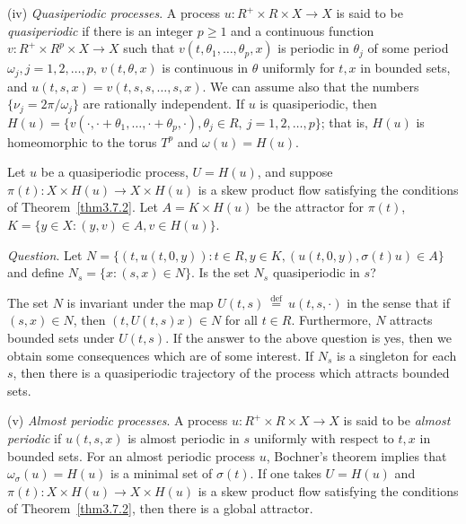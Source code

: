 \documentclass{surv-l}
\theoremstyle{plain}
\theoremstyle{definition}
\numberwithin{equation}{section}
\numberwithin{figure}{chapter}
\begin{document}
(iv) \emph{Quasiperiodic processes}. A process $u\!:R^{+}\times R\times X\rightarrow X$ is said to be \emph{quasiperiodic} if there is an integer $p\geq 1$ and a continuous function $ v\!:R^{+}\times R^{p}\times X\rightarrow X$ such that $v(t,\theta_{1},\ldots,\theta_{p},x)$ is periodic in $\theta_{j}$ of some period $\omega_{j},j= 1,2,\ldots,p,\,v(t,\theta,x)$ is continuous in $\theta$ uniformly for $t,x$ in bounded sets, and $u(t,s,x)=v(t,s,s,\ldots,s,x)$. We can assume also that the numbers $\{\nu_{j}=2\pi/\omega_{j}\}$ are rationally independent. If $u$ is quasiperiodic, then $H(u)=\{v(\cdot,\cdot+\theta_{1},\ldots,\cdot+\theta_{p},\cdot),\theta_{j}\in R,\ j=1,2,\ldots,p\}$; that is, $H(u)$ is homeomorphic to the torus $T^{p}$ and $\omega(u)=H(u)$.



Let $u$ be a quasiperiodic process, $U=H(u)$, and suppose $\pi(t)\!:X\times H(u)\rightarrow X\times H(u)$ is a skew product flow satisfying the conditions of Theorem~\ref{thm3.7.2}. Let $A=K\times H(u)$ be the attractor for $\pi(t)$, $K=\{y\in X\!:(y, v)\in A, v\in H(u)\}$.

\emph{Question}. Let $N=\{(t, u(t, 0, y))\!:t\in R, y\in K, (u(t, 0, y), \sigma(t)u)\in A\}$ and define $N_{s}=\{x\!:(s, x)\in N\}$. Is the set $N_{s}$ quasiperiodic in $s$?

The set $N$ is invariant under the map $U(t,s)\ {\overset{\mathrm{def}}{=}}\ u(t,s,\cdot)$ in the sense that if $(s,x)\in N$, then $(t,U(t,s)x)\in N$ for all $t\in R$. Furthermore, $N$ attracts bounded sets under $U(t,s)$. If the answer to the above question is yes, then we obtain some consequences which are of some interest. If $N_{s}$ is a singleton for each $s$, then there is a quasiperiodic trajectory of the process which attracts bounded sets.

(v) \emph{Almost periodic processes}. A process $u\!:R^{+}\times R\times X\rightarrow X$ is said to be \emph{almost periodic} if $u(t,s,x)$ is almost periodic in $s$ uniformly with respect to $t,x$ in bounded sets. For an almost periodic process $u$, Bochner's theorem implies that $\omega_{\sigma}(u)=H(u)$ is a minimal set of $\sigma(t)$. If one takes $U=H(u)$ and $\pi(t)\!:X\times H(u)\rightarrow X\times H(u)$ is a skew product flow satisfying the conditions of Theorem~\ref{thm3.7.2}, then there is a global attractor.
\end{document}
